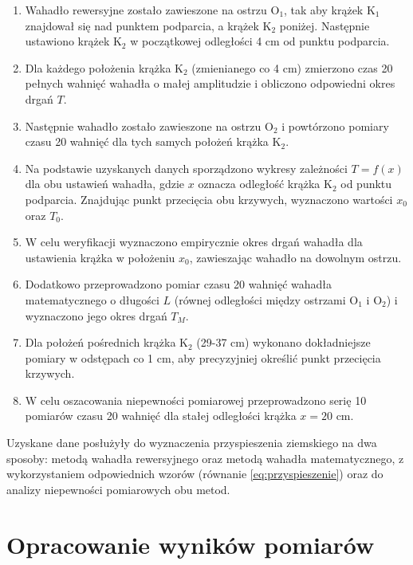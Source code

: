 \documentclass[a4paper,12pt]{article}
\begin{document}
\begin{enumerate}
  \item Wahadło rewersyjne zostało zawieszone na ostrzu O$_1$, tak aby krążek K$_1$ znajdował się nad punktem podparcia, a krążek K$_2$ poniżej. Następnie ustawiono krążek K$_2$ w początkowej odległości 4 cm od punktu podparcia.

  \item Dla każdego położenia krążka K$_2$ (zmienianego co 4 cm) zmierzono czas 20 pełnych wahnięć wahadła o małej amplitudzie i obliczono odpowiedni okres drgań $T$.

  \item Następnie wahadło zostało zawieszone na ostrzu O$_2$ i powtórzono pomiary czasu 20 wahnięć dla tych samych położeń krążka K$_2$.

  \item Na podstawie uzyskanych danych sporządzono wykresy zależności $T=f(x)$ dla obu ustawień wahadła, gdzie $x$ oznacza odległość krążka K$_2$ od punktu podparcia. Znajdując punkt przecięcia obu krzywych, wyznaczono wartości $x_0$ oraz $T_0$.

  \item W celu weryfikacji wyznaczono empirycznie okres drgań wahadła dla ustawienia krążka w położeniu $x_0$, zawieszając wahadło na dowolnym ostrzu.

  \item Dodatkowo przeprowadzono pomiar czasu 20 wahnięć wahadła matematycznego o długości $L$ (równej odległości między ostrzami O$_1$ i O$_2$) i wyznaczono jego okres drgań $T_M$.

  \item Dla położeń pośrednich krążka K$_2$ (29-37 cm) wykonano dokładniejsze pomiary w odstępach co 1 cm, aby precyzyjniej określić punkt przecięcia krzywych.

  \item W celu oszacowania niepewności pomiarowej przeprowadzono serię 10 pomiarów czasu 20 wahnięć dla stałej odległości krążka $x=20$ cm.
\end{enumerate}

Uzyskane dane posłużyły do wyznaczenia przyspieszenia ziemskiego na dwa sposoby: metodą wahadła rewersyjnego oraz metodą wahadła matematycznego, z wykorzystaniem odpowiednich wzorów (równanie \ref{eq:przyspieszenie}) oraz do analizy niepewności pomiarowych obu metod.

\section{Opracowanie wyników pomiarów}
\end{document}
